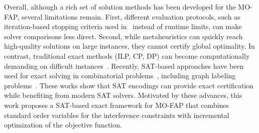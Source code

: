 \documentclass[letterpaper,journal]{IEEEtran}
\begin{document}
Overall, although a rich set of solution methods has been developed for the MO-FAP, several limitations remain. First, different evaluation protocols, such as iteration-based stopping criteria used in~\cite{Gomez2023MO} instead of runtime limits, can make solver comparisons less direct. Second, while metaheuristics can quickly reach high-quality solutions on large instances, they cannot certify global optimality. In contrast, traditional exact methods (ILP, CP, DP) can become computationally demanding on difficult instances~\cite{Aardal2007,Mahmoudi2023}.
Recently, SAT-based approaches have been used for exact solving in combinatorial problems~\cite{fichte2023silent}, including graph labeling problems~\cite{glorian2019incremental,faber2024sat}. These works show that SAT encodings can provide exact certification while benefiting from modern SAT solvers. Motivated by these advances, this work proposes a SAT-based exact framework for MO-FAP that combines standard order variables for the interference constraints with incremental optimization of the objective function.
\end{document}
